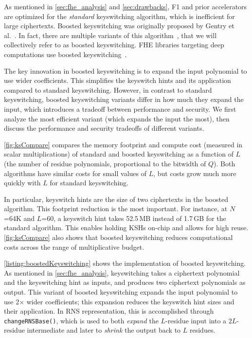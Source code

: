 \figKScompare

As mentioned in \autoref{sec:fhe_analysis} and \autoref{sec:drawbacks}, F1 and
prior accelerators are optimized for the \emph{standard} keyswitching
algorithm, which is inefficient for large ciphertexts. Boosted keyswitching
was originally proposed by Gentry et al.~\cite[Section
3.1]{gentry:crypto2012:homomorphic}. In fact, there are multiple variants of
this algorithm~\cite[Section 5.3.4]{halevi2020helib}, that we will collectively
refer to as boosted keyswitching. FHE libraries targeting deep
computations use boosted
keyswitching~\cite{gentry:crypto2012:homomorphic,halevi2020helib,heaan,mouchet2020lattigo}.

The key innovation in boosted keyswitching is to expand the input polynomial to
use wider coefficients. This simplifies the keyswitch hints and its application
compared to standard keyswitching. However, in contrast to standard
keyswitching, boosted keyswitching variants differ in how much they expand the
input, which introduces a tradeoff between performance and security. We first
analyze the most efficient variant (which expands the input the most), then
discuss the performance and security tradeoffs of different variants.

\autoref{fig:ksCompare} compares the memory footprint and compute cost
(measured in scalar multiplications) of standard and boosted keyswitching as a
function of $L$ (the number of residue polynomials, proportional to the
bitwidth of $Q$). Both algorithms have similar costs for small values of $L$,
but costs grow much more quickly with $L$ for standard keyswitching.

In particular, keyswitch hints are the size of two ciphertexts in the boosted
algorithm. This footprint reduction is the most important. For instance, at
$N$=64K and $L$=60, a keyswitch hint takes 52.5\,MB instead of 1.7\,GB for the
standard algorithm. This enables holding KSHs on-chip and allows for high
reuse. \autoref{fig:ksCompare} also shows that boosted keyswitching reduces
computational costs across the range of multiplicative budget.

\autoref{listing:boostedKeyswitching} shows the implementation of boosted
keyswitching. As mentioned in \autoref{sec:fhe_analysis}, keyswitching takes a
ciphertext polynomial and the keyswitching hint as inputs, and produces two
ciphertext polynomials as output. This variant of boosted keyswitching expands
the input polynomial to use 2$\times$ wider coefficients; this expansion
reduces the keyswitch hint sizes and their application. In RNS representation,
this is accomplished through \verb!changeRNSBase()!, which is used to both
\emph{expand} the $L$-residue input into a $2L$-residue intermediate and later
to \emph{shrink} the output back to $L$ residues.

